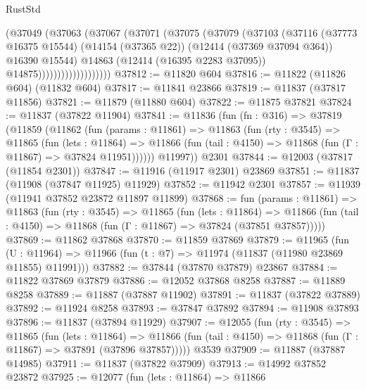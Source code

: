 \begin{lexlean}{RustStd}
\begin{coremodule}
{\begin{coremodule}
{{{{{{{{{{{{{{{{{{{{{{{{{{{{{{{{{{{{{{{{{{{{{{{{{{                            (@37049
                              (@37063
                                (@37067
                                  (@37071
                                    (@37075
                                      (@37079
                                        (@37103
                                          (@37116
                                            (@37773 @16375 @15544)
                                            (@14154 (@37365 @22))
                                            (@12414 (@37369 @37094 @364))
                                            @16390
                                            @15544)
                                          @14863
                                          (@12414 (@16395 @2283 @37095))
                                          @14875)))))))))))))))))))
@37812 := @11820 @604
@37816 := @11822 (@11826 @604) (@11832 @604)
@37817 := @11841 @23866
@37819 := @11837 (@37817 @11856)
@37821 := @11879 (@11880 @604)
@37822 := @11875 @37821
@37824 := @11837 (@37822 @11904)
@37841 := @11836
    (fun (fn : @316) =>
    @37819
      (@11859
        (@11862
          (fun (params : @11861) =>
          @11863
            (fun (rty : @3545) =>
            @11865
              (fun (lets : @11864) =>
              @11866 (fun (tail : @4150) => @11868 (fun (Γ : @11867) => @37824 @11951))))))
        @11997))
    @2301
@37844 := @12003 (@37817 (@11854 @2301))
@37847 := @11916 (@11917 @2301) @23869
@37851 := @11837 (@11908 (@37847 @11925) @11929)
@37852 := @11942 @2301
@37857 := @11939 (@11941 @37852 @23872 @11897 @11899)
@37868 := fun (params : @11861) =>
  @11863
    (fun (rty : @3545) =>
    @11865
      (fun (lets : @11864) =>
      @11866 (fun (tail : @4150) => @11868 (fun (Γ : @11867) => @37824 (@37851 @37857)))))
@37869 := @11862 @37868
@37870 := @11859 @37869
@37879 := @11965
    (fun (U : @11964) => @11966 (fun (t : @7) => @11974 (@11837 (@11980 @23869 @11855) @11991)))
@37882 := @37844 (@37870 @37879) @23867
@37884 := @11822 @37869 @37879
@37886 := @12052 @37868 @8258
@37887 := @11889 @8258
@37889 := @11887 (@37887 @11902)
@37891 := @11837 (@37822 @37889)
@37892 := @11924 @8258
@37893 := @37847 @37892
@37894 := @11908 @37893
@37896 := @11837 (@37894 @11929)
@37907 := @12055
    (fun (rty : @3545) =>
    @11865
      (fun (lets : @11864) =>
      @11866 (fun (tail : @4150) => @11868 (fun (Γ : @11867) => @37891 (@37896 @37857)))))
    @3539
@37909 := @11887 (@37887 @14985)
@37911 := @11837 (@37822 @37909)
@37913 := @14992 @37852 @23872
@37925 := @12077
    (fun (lets : @11864) =>
    @11866
}}}}}}}}}}}}}}}}}}}}}}}}}}}}}}}}}}}}}}}}}}}}}}}}}}
\end{coremodule}}
\end{coremodule}
\end{lexlean}
